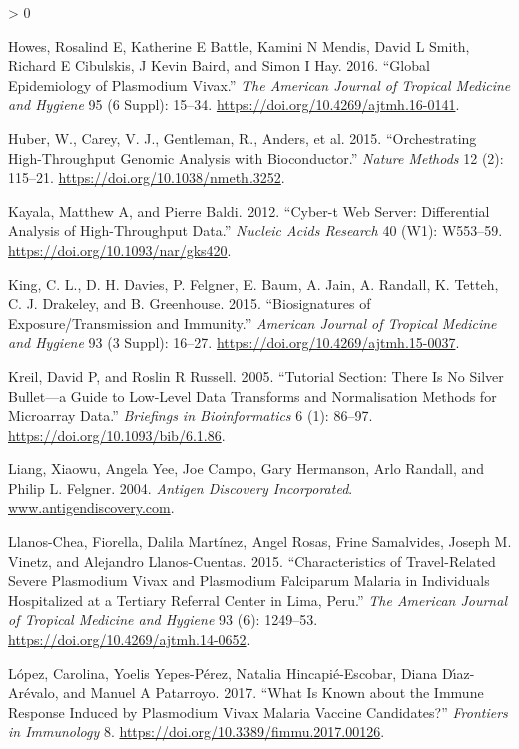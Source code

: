 \documentclass[
  a4paper]{article}
\newlength{\cslhangindent}
\newenvironment{CSLReferences}[2] %
 {%
  \setlength{\parindent}{0pt}
  \ifodd #1 \everypar{\setlength{\hangindent}{\cslhangindent}}\ignorespaces\fi
  \ifnum #2 > 0
  \setlength{\parskip}{#2\baselineskip}
  \fi
 }%
 {}
\begin{document}
\begin{CSLReferences}{1}{0}
\leavevmode\hypertarget{ref-howes2016global}{}%
Howes, Rosalind E, Katherine E Battle, Kamini N Mendis, David L Smith,
Richard E Cibulskis, J Kevin Baird, and Simon I Hay. 2016. {``Global
Epidemiology of Plasmodium Vivax.''} \emph{The American Journal of
Tropical Medicine and Hygiene} 95 (6 Suppl): 15--34.
\url{https://doi.org/10.4269/ajtmh.16-0141}.

\leavevmode\hypertarget{ref-Biobase}{}%
Huber, W., Carey, V. J., Gentleman, R., Anders, et al. 2015.
{``{O}rchestrating High-Throughput Genomic Analysis with
{B}ioconductor.''} \emph{Nature Methods} 12 (2): 115--21.
\url{https://doi.org/10.1038/nmeth.3252}.

\leavevmode\hypertarget{ref-kayala2012cyber}{}%
Kayala, Matthew A, and Pierre Baldi. 2012. {``Cyber-t Web Server:
Differential Analysis of High-Throughput Data.''} \emph{Nucleic Acids
Research} 40 (W1): W553--59. \url{https://doi.org/10.1093/nar/gks420}.

\leavevmode\hypertarget{ref-King2015FOC}{}%
King, C. L., D. H. Davies, P. Felgner, E. Baum, A. Jain, A. Randall, K.
Tetteh, C. J. Drakeley, and B. Greenhouse. 2015. {``Biosignatures of
Exposure/Transmission and Immunity.''} \emph{American Journal of
Tropical Medicine and Hygiene} 93 (3 Suppl): 16--27.
\url{https://doi.org/10.4269/ajtmh.15-0037}.

\leavevmode\hypertarget{ref-kreil2005bullet}{}%
Kreil, David P, and Roslin R Russell. 2005. {``Tutorial Section: There
Is No Silver Bullet---a Guide to Low-Level Data Transforms and
Normalisation Methods for Microarray Data.''} \emph{Briefings in
Bioinformatics} 6 (1): 86--97. \url{https://doi.org/10.1093/bib/6.1.86}.

\leavevmode\hypertarget{ref-adiinc}{}%
Liang, Xiaowu, Angela Yee, Joe Campo, Gary Hermanson, Arlo Randall, and
Philip L. Felgner. 2004. \emph{{Antigen Discovery Incorporated}}.
\href{https://www.antigendiscovery.com}{www.antigendiscovery.com}.

\leavevmode\hypertarget{ref-llanoschea2015}{}%
Llanos-Chea, Fiorella, Dalila Martínez, Angel Rosas, Frine Samalvides,
Joseph M. Vinetz, and Alejandro Llanos-Cuentas. 2015. {``Characteristics
of Travel-Related Severe Plasmodium Vivax and Plasmodium Falciparum
Malaria in Individuals Hospitalized at a Tertiary Referral Center in
Lima, {Peru}.''} \emph{The American Journal of Tropical Medicine and
Hygiene} 93 (6): 1249--53. \url{https://doi.org/10.4269/ajtmh.14-0652}.

\leavevmode\hypertarget{ref-lopez2017}{}%
López, Carolina, Yoelis Yepes-Pérez, Natalia Hincapié-Escobar, Diana
Dı́az-Arévalo, and Manuel A Patarroyo. 2017. {``What Is Known about the
Immune Response Induced by Plasmodium Vivax Malaria Vaccine
Candidates?''} \emph{Frontiers in Immunology} 8.
\url{https://doi.org/10.3389/fimmu.2017.00126}.


\end{CSLReferences}
\end{document}
